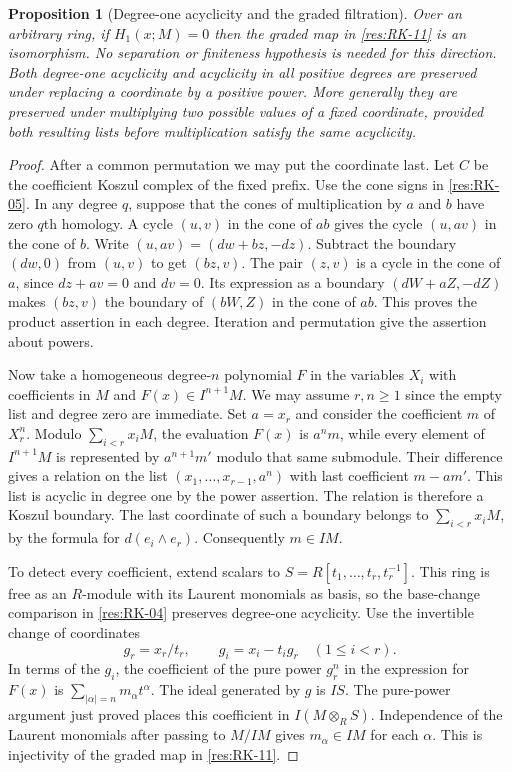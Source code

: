 \documentclass[11pt,oneside,openany]{book}
\newtheorem{proposition}[theorem]{Proposition}
\theoremstyle{definition}
\theoremstyle{remark}
\begin{document}
\begin{proposition}[Degree-one acyclicity and the graded filtration]
\label{res:RK-15}
Over an arbitrary ring, if $H_1(x;M)=0$ then the graded map in
\ref{res:RK-11} is an isomorphism. No separation or finiteness
hypothesis is needed for this direction. Both degree-one acyclicity
and acyclicity in all positive degrees are preserved under replacing
a coordinate by a positive power. More generally they are preserved
under multiplying two possible values of a fixed coordinate, provided
both resulting lists before multiplication satisfy the same acyclicity.
\end{proposition}
\begin{proof}
After a common permutation we may put the coordinate last. Let
$C$ be the coefficient Koszul complex of the fixed prefix. Use the
cone signs in \ref{res:RK-05}. In any degree $q$, suppose that the
cones of multiplication by $a$ and $b$ have zero $q$th homology.
A cycle $(u,v)$ in the cone of $ab$ gives the cycle $(u,av)$ in the
cone of $b$. Write $(u,av)=(dw+bz,-dz)$.
Subtract the boundary $(dw,0)$ from $(u,v)$ to get $(bz,v)$.
The pair $(z,v)$ is a cycle in the cone of $a$, since
$dz+av=0$ and $dv=0$. Its expression as a boundary
$(dW+aZ,-dZ)$ makes $(bz,v)$ the boundary of $(bW,Z)$
in the cone of $ab$. This proves the product assertion in each
degree. Iteration and permutation give the assertion about powers.

Now take a homogeneous degree-$n$ polynomial $F$ in the variables
$X_i$ with coefficients in $M$ and $F(x)\in I^{n+1}M$.
We may assume $r,n\ge1$ since the empty list and degree zero
are immediate. Set $a=x_r$ and consider the coefficient $m$ of
$X_r^n$. Modulo $\sum_{i<r} x_iM$, the evaluation $F(x)$ is
$a^nm$, while every element of $I^{n+1}M$ is represented by
$a^{n+1}m'$ modulo that same submodule. Their difference gives a
relation on the list $(x_1,\ldots,x_{r-1},a^n)$ with last
coefficient $m-am'$. This list is acyclic in degree one by the
power assertion. The relation is therefore a Koszul boundary.
The last coordinate of such a boundary belongs to
$\sum_{i<r}x_iM$, by the formula for $d(e_i\wedge e_r)$.
Consequently $m\in IM$.

To detect every coefficient, extend scalars to
$S=R[t_1,\ldots,t_r,t_r^{-1}]$. This ring is free as an $R$-module
with its Laurent monomials as basis, so the base-change comparison
in \ref{res:RK-04} preserves degree-one acyclicity.
Use the invertible change of coordinates
\[
 g_r=x_r/t_r,\qquad g_i=x_i-t_i g_r\quad(1\le i<r).
\]
In terms of the $g_i$, the coefficient of the pure power $g_r^n$
in the expression for $F(x)$ is $\sum_{|\alpha|=n}m_\alpha t^\alpha$.
The ideal generated by $g$ is $IS$. The pure-power argument just
proved places this coefficient in $I(M\otimes_R S)$. Independence
of the Laurent monomials after passing to $M/IM$ gives
$m_\alpha\in IM$ for each $\alpha$. This is injectivity of the
graded map in \ref{res:RK-11}.
\end{proof}
\end{document}
